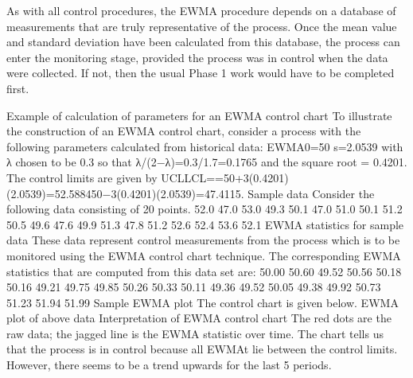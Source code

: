 As with all control procedures, the EWMA procedure depends on a database of measurements that are truly representative of the process. Once the mean value and standard deviation have been calculated from this database, the process can enter the monitoring stage, provided the process was in control when the data were collected. If not, then the usual Phase 1 work would have to be completed first.

Example of calculation of parameters for an EWMA control chart	To illustrate the construction of an EWMA control chart, consider a process with the following parameters calculated from historical data:
EWMA0=50
s=2.0539
with λ chosen to be 0.3 so that λ/(2−λ)=0.3/1.7=0.1765 and the square root = 0.4201. The control limits are given by
UCLLCL==50+3(0.4201)(2.0539)=52.588450−3(0.4201)(2.0539)=47.4115.
Sample data	Consider the following data consisting of 20 points.
  52.0 47.0 53.0 49.3 50.1 47.0
  51.0 50.1 51.2 50.5 49.6 47.6
  49.9 51.3 47.8 51.2 52.6 52.4
  53.6 52.1
EWMA statistics for sample data	These data represent control measurements from the process which is to be monitored using the EWMA control chart technique. The corresponding EWMA statistics that are computed from this data set are:
  50.00 50.60 49.52 50.56 50.18
  50.16 49.21 49.75 49.85 50.26
  50.33 50.11 49.36 49.52 50.05
  49.38 49.92 50.73 51.23 51.94
  51.99
Sample EWMA plot	The control chart is given below.
EWMA plot of above data
Interpretation of EWMA control chart	The red dots are the raw data; the jagged line is the EWMA statistic over time. The chart tells us that the process is in control because all EWMAt lie between the control limits. However, there seems to be a trend upwards for the last 5 periods.

